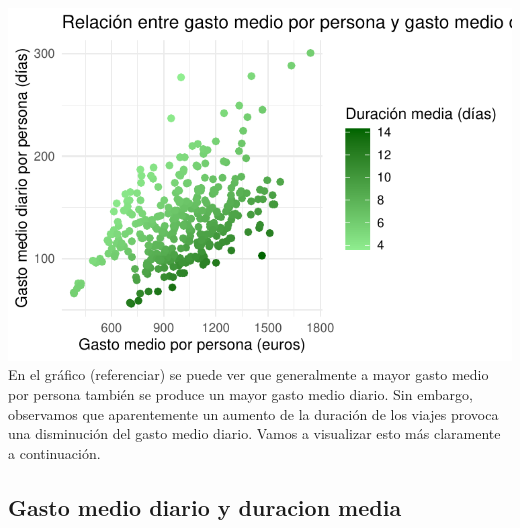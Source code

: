 \documentclass[data,article,submit,moreauthors,pdftex]{Definitions/mdpi}
\begin{document}
\includegraphics{ProyectoAED2024_Rmd_files/figure-latex/unnamed-chunk-30-1.pdf}
En el gráfico (referenciar) se puede ver que generalmente a mayor gasto
medio por persona también se produce un mayor gasto medio diario. Sin
embargo, observamos que aparentemente un aumento de la duración de los
viajes provoca una disminución del gasto medio diario. Vamos a
visualizar esto más claramente a continuación.

\subsection{Gasto medio diario y duracion
media}\label{gasto-medio-diario-y-duracion-media}
\end{document}
